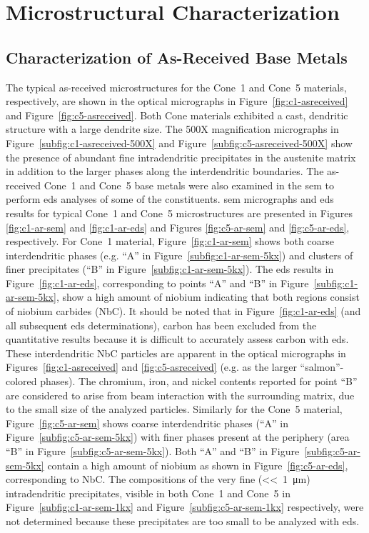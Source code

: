 {\section{Microstructural Characterization}
\subsection{Characterization of As-Received Base Metals}
The typical as-received microstructures for the Cone~1 and Cone~5 materials, respectively, are shown in the optical micrographs in Figure~\ref{fig:c1-asreceived} and Figure~\ref{fig:c5-asreceived}.  Both Cone materials exhibited a cast, dendritic structure with a large dendrite size.  The 500X magnification micrographs in Figure~\ref{subfig:c1-asreceived-500X} and Figure~\ref{subfig:c5-asreceived-500X} show the presence of abundant fine intradendritic precipitates in the austenite matrix in addition to the larger phases along the interdendritic boundaries. The as-received Cone~1 and Cone~5 base metals were also examined in the \gls{sem} to perform \gls{eds} analyses of some of the constituents. \Gls{sem} micrographs and \gls{eds} results for typical Cone~1 and Cone~5 microstructures are presented in Figures \ref{fig:c1-ar-sem} and \ref{fig:c1-ar-eds} and Figures \ref{fig:c5-ar-sem} and \ref{fig:c5-ar-eds}, respectively. For Cone~1 material, Figure~\ref{fig:c1-ar-sem} shows both coarse interdendritic phases (e.g. ``A'' in Figure~\ref{subfig:c1-ar-sem-5kx}) and clusters of finer precipitates (``B'' in Figure~\ref{subfig:c1-ar-sem-5kx}). The \gls{eds} results in Figure~\ref{fig:c1-ar-eds}, corresponding to points ``A'' and ``B'' in Figure~\ref{subfig:c1-ar-sem-5kx}, show a high amount of niobium indicating that both regions consist of niobium carbides (NbC). It should be noted that in Figure~\ref{fig:c1-ar-eds} (and all subsequent \gls{eds} determinations), carbon has been excluded from the quantitative results because it is difficult to accurately assess carbon with \gls{eds}. These interdendritic NbC particles are apparent in the optical micrographs in Figures~\ref{fig:c1-asreceived} and \ref{fig:c5-asreceived} (e.g. as the larger ``salmon''-colored phases). The chromium, iron, and nickel contents reported for point ``B'' are considered to arise from beam interaction with the surrounding matrix, due to the small size of the analyzed particles. Similarly for the Cone~5 material, Figure~\ref{fig:c5-ar-sem} shows coarse interdendritic phases (``A'' in Figure~\ref{subfig:c5-ar-sem-5kx}) with finer phases present at the periphery (area ``B'' in Figure~\ref{subfig:c5-ar-sem-5kx}). Both ``A'' and ``B'' in Figure~\ref{subfig:c5-ar-sem-5kx} contain a high amount of niobium as shown in Figure~\ref{fig:c5-ar-eds}, corresponding to NbC. The compositions of the very fine (<<~\SI{1}{\micro\meter}) intradendritic precipitates, visible in both Cone~1 and Cone~5 in Figure~\ref{subfig:c1-ar-sem-1kx} and Figure~\ref{subfig:c5-ar-sem-1kx} respectively, were not determined because these precipitates are too small to be analyzed with \gls{eds}. 

}

